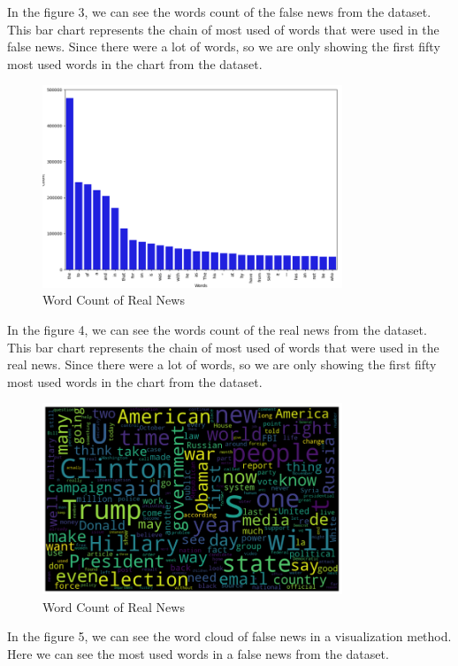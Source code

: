 \documentclass{article}
\begin{document}
    In the figure 3, we can see the words count of the false news from the dataset. This bar chart represents the chain of most used of words that were used in the false news. Since there were a lot of words, so we are only showing the first fifty most used words in the chart from the dataset.\break
    \begin{figure}[!h]
    \centering
    \includegraphics[width=0.8\textwidth]{image4.png}
    \caption{Word Count of Real News}
    \label{fig:label}
    \end{figure}\break
    In the figure 4, we can see the words count of the real news from the dataset. This bar chart represents the chain of most used of words that were used in the real news. Since there were a lot of words, so we are only showing the first fifty most used words in the chart from the dataset.
    \break
    \begin{figure}[!h]
    \centering
    \includegraphics[width=0.8\textwidth]{image5.png}
    \caption{Word Count of Real News}
    \label{fig:label}
    \end{figure}\break
    In the figure 5, we can see the word cloud of false news in a visualization method.  Here we can see the most used words in a false news from the dataset. 
\end{document}
